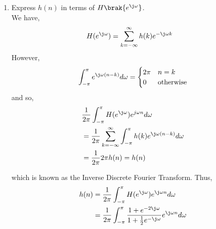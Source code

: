 \documentclass[journal,12pt,twocolumn]{IEEEtran}
\renewcommand\thesection{\arabic{section}}
\begin{document}
\begin{enumerate}[label=\thesection.\arabic*]
\item Express $h(n)$ in terms of $H\brak{e^{\j \omega}}$.
\\
\solution We have,
\begin{align}
	H(e^{\j\omega}) &= \sum_{k = -\infty}^{\infty}h(k)e^{-\j\omega k}
\end{align}
However,
\begin{align}
	\int_{-\pi}^{\pi}e^{\j\omega(n - k)}d\omega =
	\begin{cases}
		2\pi & n = k \\
		0 & \textrm{otherwise}
	\end{cases}
\end{align}
and so,
\begin{align}
	&\frac{1}{2\pi}\int_{-\pi}^{\pi}H(e^{\j\omega})e^{j\omega n}d\omega \\
	&= \frac{1}{2\pi}\sum_{k = -\infty}^{\infty}\int_{-\pi}^{\pi}h(k)e^{\j\omega(n - k)}d\omega \\
	&= \frac{1}{2\pi}2\pi h(n) = h(n)
\end{align}

which is known as the Inverse Discrete Fourier Transform. Thus,
\begin{align}
	h(n) &= \frac{1}{2\pi}\int_{-\pi}^{\pi}H(e^{\j\omega})e^{\j\omega n}d\omega \\
	&= \frac{1}{2\pi}\int_{-\pi}^{\pi}\frac{1 + e^{-2\j\omega}}{1 + \frac{1}{2}e^{-\j\omega}}e^{\j\omega n}d\omega
	\label{eq:idtft}
\end{align}
\end{enumerate}
\end{document}
